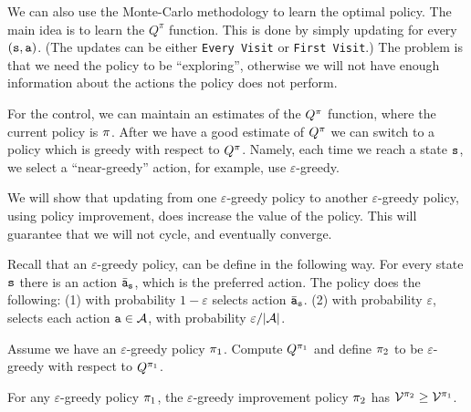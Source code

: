 We can also use the Monte-Carlo methodology to learn the optimal
policy.
%
The main idea is to learn the $Q^\pi$ function. This is done by
simply updating for every $({\tt s},{\tt a})$. (The updates can be
either {\tt Every Visit} or {\tt First Visit}.) The problem is that
we need the policy to be ``exploring'', otherwise we will not have
enough information about the actions the policy does not perform.

For the control, we can maintain an estimates of the $Q^\pi$
function, where the current policy is $\pi$. After we have a
good estimate of $Q^\pi$ we can switch to a policy which is
greedy with respect to $Q^\pi$. Namely, each time we reach a
state ${\tt s}$, we select a ``near-greedy'' action, for example, use
$\varepsilon$-greedy.

We will show that updating from one $\varepsilon$-greedy policy to
another $\varepsilon$-greedy policy, using policy improvement, does
increase the value of the policy. This will guarantee that we will not cycle, and eventually converge.

Recall that an $\varepsilon$-greedy policy, can be define in the
following way. For every state ${\tt s}$ there is an action
$\bar{{\tt a}}_{\tt s}$, which is the preferred action. The policy
does the following: (1) with probability $1-\varepsilon$ selects action $\bar{{\tt a}}_{\tt s}$. (2) with probability $\varepsilon$, selects
each action ${\tt a} \in \mathcal{A}$, with probability
$\varepsilon/|\mathcal{A}|$.

Assume we have an $\varepsilon$-greedy policy $\pi_1$. Compute
$Q^{\pi_1}$ and define $\pi_2$ to be $\varepsilon$-greedy
with respect to $Q^{\pi_1}$.

\begin{theorem}
For any $\varepsilon$-greedy policy $\pi_1$, the
$\varepsilon$-greedy improvement policy $\pi_2$ has
$\mathcal{V}^{\pi_2}\geq \mathcal{V}^{\pi_1}$.
\end{theorem}

